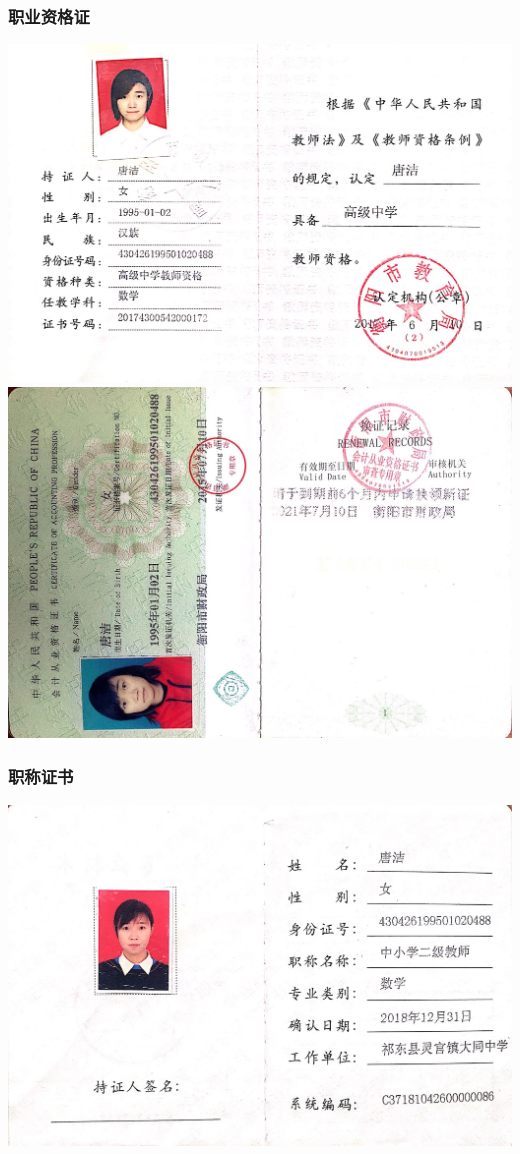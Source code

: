 \documentclass[UFT8]{ctexart}%
\begin{document}
\subsubsection{职业资格证}
\begin{center}
\includegraphics[scale=0.20]{figs/教师资格证.JPG }
\includegraphics[scale=0.2]{figs/20150710.JPG }
\end{center}

\subsubsection{职称证书}
\begin{center}
\includegraphics[scale=0.25]{figs/中二职称证书.JPG }
 \end{center}
 
\end{document}
